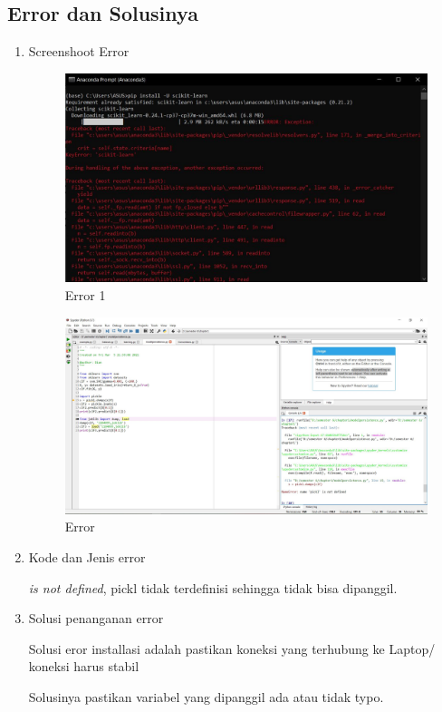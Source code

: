 \subsection{Error dan Solusinya}
\begin{enumerate}
		\item Screenshoot Error
		\begin{figure}[H]
		\centering
		\includegraphics[width=1\textwidth]{figures/1184095/chapter1/eror install.JPG}
		\caption{Error 1}
		\label{print}
		\end{figure}
		
		

		\begin{figure}[H]
		\centering
		\includegraphics[width=1\textwidth]{figures/1184095/chapter1/eror 2.JPG}
		\caption{Error}
		\label{print}
		\end{figure}
		
		\item Kode dan Jenis error
		
			\subitem \textit{is not defined}, pickl tidak terdeﬁnisi sehingga tidak bisa dipanggil.
			
			

		\item Solusi penanganan error
		
		    \subitem Solusi eror installasi adalah pastikan koneksi yang terhubung ke Laptop/ koneksi harus stabil
		    
			\subitem Solusinya pastikan variabel yang dipanggil ada atau tidak typo. 
			
			
	
		
	\end{enumerate}

